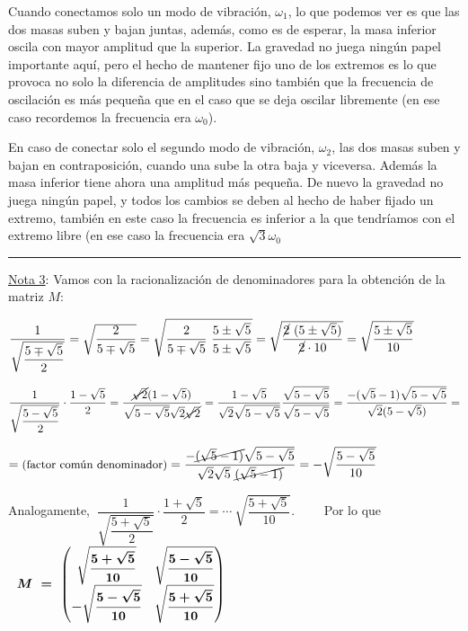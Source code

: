 Cuando conectamos solo un modo de vibración, $\omega_1$, lo que podemos ver es que las dos masas suben y bajan juntas, además, como es de esperar, la masa inferior oscila con mayor amplitud que la superior. La gravedad no juega ningún papel importante aquí, pero el hecho de mantener fijo uno de los extremos es lo que provoca no solo la diferencia de amplitudes sino también que la frecuencia de oscilación es más pequeña que en el caso que se deja oscilar libremente (en ese caso recordemos la frecuencia era $\omega_0$).


En caso de conectar solo el segundo modo de vibración, $\omega_2$, las dos masas suben y bajan en contraposición, cuando una sube la otra baja y viceversa. Además la masa inferior tiene ahora una amplitud más pequeña. De nuevo la gravedad no juega ningún papel, y todos los cambios se deben al hecho de haber fijado un extremo, también en este caso la frecuencia es inferior a la que tendríamos con el extremo libre (en ese caso la frecuencia era $\sqrt{3} \omega_0$
	






\color{RoyalBlue}
\begin{center}\rule{250pt}{0.2pt}\end{center}

\begin{small}
\underline{Nota 3}: Vamos con la racionalización de denominadores para la obtención de la matriz $M$:

$\dfrac 1{\sqrt{ \dfrac{5 \mp \sqrt{5}}{2}}} = \sqrt{\dfrac{2}{5\mp \sqrt{5}}}= \sqrt{\dfrac{2}{5\mp\sqrt{5}} \ \dfrac{5\pm \sqrt{5}}{5\pm \sqrt{5}}} = \sqrt{\dfrac{\cancel{2} \ (5 \pm \sqrt{5})}{\cancel{2} \cdot 10}} = \sqrt{\dfrac{5 \pm \sqrt{5}}{10}}$

$\dfrac 1{\sqrt{ \dfrac{5 - \sqrt{5}}{2}}} \cdot \dfrac {1-\sqrt{5}}{2} = 
\dfrac{\cancel{\sqrt{2}} (1-\sqrt{5} ) }{\sqrt{5-\sqrt{
5}} \sqrt{2} \cancel{\sqrt{2}}}=\dfrac { 1-\sqrt{5} } {\sqrt 2 \sqrt{5-\sqrt{5}} } \dfrac {\sqrt{5-\sqrt{5}}}{ \sqrt{5-\sqrt{5}}} =\dfrac{-(\sqrt{5}-1) \sqrt{5-\sqrt{5}}}{\sqrt{2} (5-\sqrt{5})}=$

$=\text{\begin{small}(factor común denominador)\end{small}}=\dfrac{- \cancel{(\sqrt{5}-1)} \sqrt{5-\sqrt{5}}}{\sqrt{2} \sqrt{5}\ \cancel{(\sqrt{5}-1)}} = -\sqrt{\dfrac{5-\sqrt{5}}{10}}$


Analogamente, $\ \dfrac 1{\sqrt{ \dfrac{5 + \sqrt{5}}{2}}} \cdot \dfrac {1+\sqrt{5}}{2} = \cdots \ \sqrt{\dfrac{5+\sqrt{5}}{10}}$.
$\qquad$Por lo que  $\boldsymbol{ \ \ M \ = \ \mqty( \sqrt{\dfrac{5+\sqrt{5}}{10}}  &  \sqrt{\dfrac{5-\sqrt{5}}{10}} \\ -\sqrt{\dfrac{5-\sqrt{5}}{10}}  &  \sqrt{\dfrac{5+\sqrt{5}}{10}} ) }$

$\,$
\end{small}

